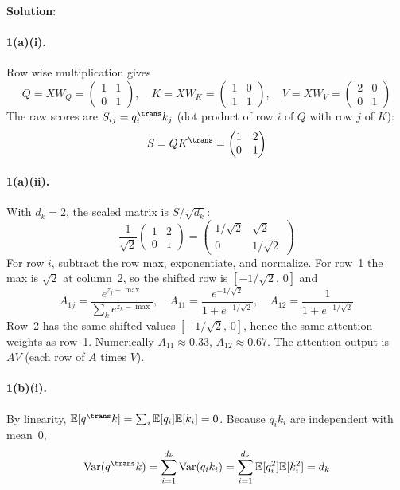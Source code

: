 \documentclass[submit]{../harvardml}
\newcommand{\E}{\mathbb{E}}
\newenvironment{solution}{
    \vspace{2mm}
    \color{blue}\noindent\textbf{Solution}:
}{}
\begin{document}
\newpage


\begin{solution}

\paragraph{1(a)(i).}
Row wise multiplication gives
\[
  Q = X W_Q = \begin{pmatrix} 1 & 1 \\ 0 & 1 \end{pmatrix}, \quad
  K = X W_K = \begin{pmatrix} 1 & 0 \\ 1 & 1 \end{pmatrix}, \quad
  V = X W_V = \begin{pmatrix} 2 & 0 \\ 0 & 1 \end{pmatrix}
\]
The raw scores are $S_{ij} = q_i^\trans k_j$ (dot product of row $i$ of $Q$ with row $j$ of $K$):
\[
  S = Q K^\trans = \begin{pmatrix} 1 & 2 \\ 0 & 1 \end{pmatrix}
\]

\paragraph{1(a)(ii).}
With $d_k = 2$, the scaled matrix is $S/\sqrt{d_k}$:
\[
  \frac{1}{\sqrt{2}}\begin{pmatrix} 1 & 2 \\ 0 & 1 \end{pmatrix}
  = \begin{pmatrix} 1/\sqrt{2} & \sqrt{2} \\ 0 & 1/\sqrt{2} \end{pmatrix}
\]
For row $i$, subtract the row max, exponentiate, and normalize. For row~1 the max is $\sqrt{2}$ at column~2, so the shifted row is $[-1/\sqrt{2},\,0]$ and
\[
  A_{1j} = \frac{e^{z_j - \max}}{\sum_k e^{z_k - \max}}, \quad
  A_{11} = \frac{e^{-1/\sqrt{2}}}{1 + e^{-1/\sqrt{2}}}, \quad A_{12} = \frac{1}{1 + e^{-1/\sqrt{2}}}
\]
Row~2 has the same shifted values $[-1/\sqrt{2},\,0]$, hence the same attention weights as row~1. Numerically $A_{11} \approx 0.33$, $A_{12} \approx 0.67$. The attention output is $A V$ (each row of $A$ times $V$).

\paragraph{1(b)(i).}
By linearity, $\E[q^\trans k] = \sum_i \E[q_i]\E[k_i] = 0$. Because $q_i k_i$ are independent with mean~$0$,
\[
  \mathrm{Var}(q^\trans k) = \sum_{i=1}^{d_k} \mathrm{Var}(q_i k_i)
  = \sum_{i=1}^{d_k} \E[q_i^2]\E[k_i^2] = d_k
\]


\end{solution}
\end{document}
